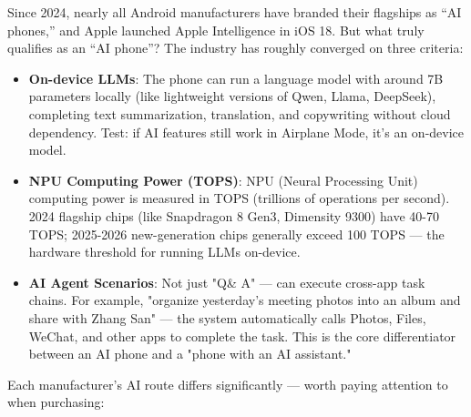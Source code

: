 


Since 2024, nearly all Android manufacturers have branded their flagships as “AI phones,” and Apple launched Apple Intelligence in iOS 18. But what truly qualifies as an “AI phone”? The industry has roughly converged on three criteria:

\begin{itemize}
  \item \textbf{On-device LLMs}: The phone can run a language model with around 7B parameters locally (like lightweight versions of Qwen, Llama, DeepSeek), completing text summarization, translation, and copywriting without cloud dependency. Test: if AI features still work in Airplane Mode, it's an on-device model.
  \item \textbf{NPU Computing Power (TOPS)}: NPU (Neural Processing Unit) computing power is measured in TOPS (trillions of operations per second). 2024 flagship chips (like Snapdragon 8 Gen3, Dimensity 9300) have 40-70 TOPS; 2025-2026 new-generation chips generally exceed 100 TOPS — the hardware threshold for running LLMs on-device.
  \item \textbf{AI Agent Scenarios}: Not just "Q\& A" — can execute cross-app task chains. For example, "organize yesterday's meeting photos into an album and share with Zhang San" — the system automatically calls Photos, Files, WeChat, and other apps to complete the task. This is the core differentiator between an AI phone and a "phone with an AI assistant."
\end{itemize}


Each manufacturer's AI route differs significantly — worth paying attention to when purchasing:

